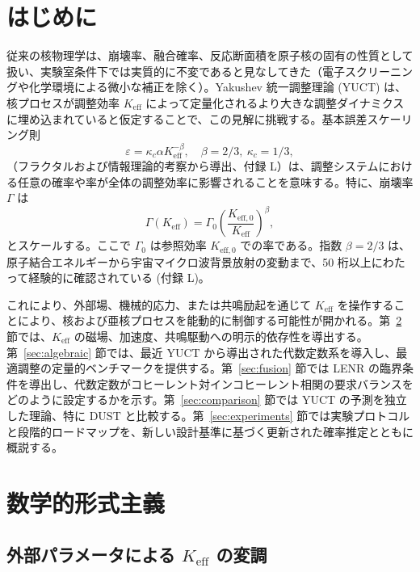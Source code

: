 \documentclass[12pt]{article}
\newcommand{\Keff}{K_{\mathrm{eff}}}
\newcommand{\Keffzero}{K_{\mathrm{eff},0}}
\theoremstyle{remark}
\begin{document}
	\tableofcontents
	\newpage
	
	\section{はじめに}
	\label{sec:intro}
	
	従来の核物理学は、崩壊率、融合確率、反応断面積を原子核の固有の性質として扱い、実験室条件下では実質的に不変であると見なしてきた（電子スクリーニングや化学環境による微小な補正を除く）。Yakushev 統一調整理論 (YUCT) は、核プロセスが調整効率 \(\Keff\) によって定量化されるより大きな調整ダイナミクスに埋め込まれていると仮定することで、この見解に挑戦する。基本誤差スケーリング則
	\begin{equation}
		\varepsilon = \kappa_c \alpha \Keff^{-\beta}, \quad \beta = 2/3,\ \kappa_c = 1/3,
		\label{eq:universal-scaling}
	\end{equation}
	（フラクタルおよび情報理論的考察から導出、付録 L）は、調整システムにおける任意の確率や率が全体の調整効率に影響されることを意味する。特に、崩壊率 \(\Gamma\) は
	\begin{equation}
		\Gamma(\Keff) = \Gamma_0 \left( \frac{\Keffzero}{\Keff} \right)^{\beta},
		\label{eq:decay-rate}
	\end{equation}
	とスケールする。ここで \(\Gamma_0\) は参照効率 \(\Keffzero\) での率である。指数 \(\beta = 2/3\) は、原子結合エネルギーから宇宙マイクロ波背景放射の変動まで、50 桁以上にわたって経験的に確認されている (付録 L)。
	
	これにより、外部場、機械的応力、または共鳴励起を通じて \(\Keff\) を操作することにより、核および亜核プロセスを能動的に制御する可能性が開かれる。第~\ref{sec:math} 節では、\(\Keff\) の磁場、加速度、共鳴駆動への明示的依存性を導出する。第~\ref{sec:algebraic} 節では、最近 YUCT から導出された代数定数系を導入し、最適調整の定量的ベンチマークを提供する。第~\ref{sec:fusion} 節では LENR の臨界条件を導出し、代数定数がコヒーレント対インコヒーレント相関の要求バランスをどのように設定するかを示す。第~\ref{sec:comparison} 節では YUCT の予測を独立した理論、特に DUST と比較する。第~\ref{sec:experiments} 節では実験プロトコルと段階的ロードマップを、新しい設計基準に基づく更新された確率推定とともに概説する。
	
	\section{数学的形式主義}
	\label{sec:math}
	
	\subsection{外部パラメータによる \(\Keff\) の変調}
	
\end{document}
